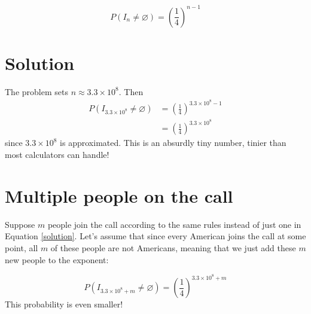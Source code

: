 \documentclass[]{article}
\begin{document}
\begin{equation}
P(I_n \neq\varnothing) = \left(\frac{1}{4}\right)^{n-1}\label{solution}
\end{equation}

\section{Solution}
The problem sets $n \approx 3.3\times 10^8$. Then
\begin{align}
P(I_{3.3\times 10^8} \neq\varnothing) &= \left(\frac{1}{4}\right)^{3.3\times 10^8-1}\nonumber\\
&= \left(\frac{1}{4}\right)^{3.3\times 10^8}\label{solution_plugged_in}
\end{align}
since $3.3\times 10^8$ is approximated. This is an absurdly tiny number, tinier than most calculators can handle!

\section{Multiple people on the call}
Suppose $m$ people join the call according to the same rules instead of just one in Equation \eqref{solution}. Let's assume that since every American joins the call at some point, all $m$ of these people are not Americans, meaning that we just add these $m$ new people to the exponent:

\begin{equation}
P(I_{3.3\times 10^8 + m} \neq\varnothing) = \left(\frac{1}{4}\right)^{3.3\times 10^8 + m}
\end{equation}
This probability is even smaller!
\end{document}
